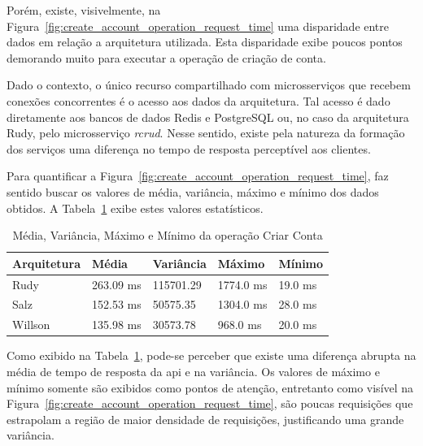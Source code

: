 Porém, existe, visivelmente, na Figura~\ref{fig:create_account_operation_request_time} uma disparidade entre dados em relação a arquitetura utilizada.
%
Esta disparidade exibe poucos pontos demorando muito para executar a operação de criação de conta.

Dado o contexto, o único recurso compartilhado com microsserviços que recebem conexões concorrentes é o acesso aos dados da arquitetura.
%
Tal acesso é dado diretamente aos bancos de dados Redis e PostgreSQL ou, no caso da arquitetura Rudy, pelo microsserviço \textit{rcrud}.
%
Nesse sentido, existe pela natureza da formação dos serviços uma diferença no tempo de resposta perceptível aos clientes.

Para quantificar a Figura~\ref{fig:create_account_operation_request_time}, faz sentido buscar os valores de média, variância, máximo e mínimo dos dados obtidos.
%
A Tabela~\ref{tab:create_account_operation_request_time} exibe estes valores estatísticos.

\begin{table}[htb!]
\centering
\begin{adjustbox}{max width=\textwidth}
\caption{Média, Variância, Máximo e Mínimo da operação Criar Conta}
\label{tab:create_account_operation_request_time}
\begin{tabular}{l|l|l|l|l}
\hline \hline
Arquitetura & Média     & Variância & Máximo    & Mínimo  \\ \hline \hline
Rudy        & 263.09 ms & 115701.29 & 1774.0 ms & 19.0 ms \\ \hline
Salz        & 152.53 ms & 50575.35  & 1304.0 ms & 28.0 ms \\ \hline
Willson     & 135.98 ms & 30573.78  & 968.0 ms  & 20.0 ms \\ \hline \hline
\end{tabular}

\end{adjustbox}
\end{table}

Como exibido na Tabela~\ref{tab:create_account_operation_request_time}, pode-se perceber que existe uma diferença abrupta na média de tempo de resposta da \ac{api} e na variância.
%
Os valores de máximo e mínimo somente são exibidos como pontos de atenção, entretanto como visível na Figura~\ref{fig:create_account_operation_request_time}, são poucas requisições que estrapolam a região de maior densidade de requisições, justificando uma grande variância.

